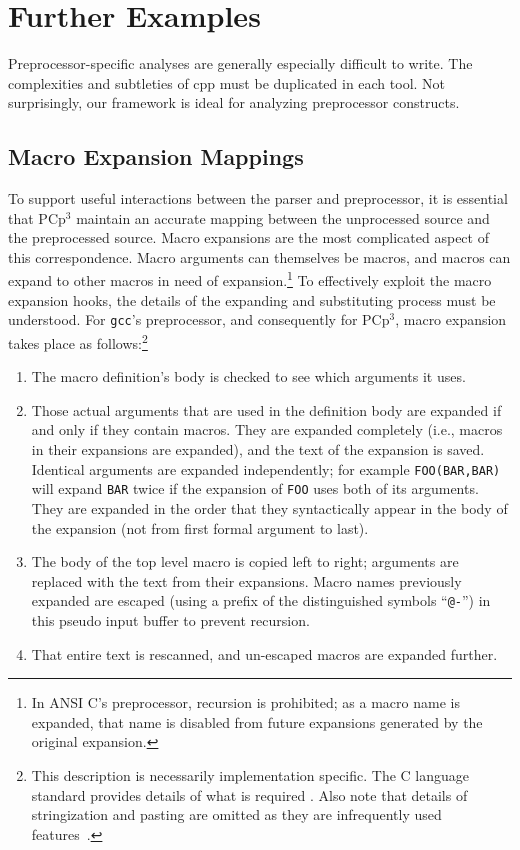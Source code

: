 \documentclass{article}
\newcommand{\pcp}{\mbox{\textsf{PCp}$^3$}}
\newcommand{\Cpp}{\mbox{\textsf{cpp}}}
\newcommand{\C}{\mbox{C}}
\newcommand{\ie}{i.e.,}
\begin{document}

\section*{Further Examples}
\label{sec:further_examples}

Preprocessor-specific analyses are generally especially difficult to
write.  The complexities and subtleties of \Cpp{} must be duplicated in
each tool.  Not surprisingly, our framework is ideal for analyzing
preprocessor constructs.

\subsection*{Macro Expansion Mappings}
\label{ssec:macro_exp_map}
To support useful interactions between the parser and preprocessor, it
is essential that \pcp{} maintain an accurate mapping between the
unprocessed source and the preprocessed source.  Macro expansions are
the most complicated aspect of this correspondence.  Macro arguments can
themselves be macros, and macros can expand to other macros in need of
expansion.\footnote{In ANSI \C{}'s preprocessor, recursion is
  prohibited; as a macro name is expanded, that name is disabled from
  future expansions generated by the original expansion.}  To
effectively exploit the macro expansion hooks, the details of the
expanding and substituting process must be understood.  For
\texttt{gcc}'s preprocessor, and consequently for \pcp{}, macro
expansion takes place as follows:\footnote{This description is necessarily
  implementation specific.  The \C{} language standard provides details
of what is required \cite[Ch.~3]{Harbison91}.  Also note that
  details of stringization and pasting are omitted as they are
  infrequently used features~\cite{EmpCpp}.}

\begin{enumerate}
\item The macro definition's body is checked to see which arguments it uses.
\item Those actual arguments that are used in the definition body are
      expanded if and only if they contain macros.  They are expanded
      completely (\ie{} macros in their expansions are expanded), and
      the text of the expansion is saved.  Identical arguments are
      expanded independently; for example \texttt{FOO(BAR,BAR)} will
      expand \texttt{BAR} twice if the expansion of \texttt{FOO} uses
      both of its arguments.  They are expanded in the order that they
      syntactically appear in the body of the expansion (not from first formal
      argument to last).
\item The body of the top level macro is copied left to right; arguments
      are replaced with the text from their expansions.  Macro names
      previously expanded are escaped (using a prefix of the
      distinguished symbols ``\texttt{@-}'') in this pseudo input buffer
      to prevent recursion.
\item That entire text is rescanned, and un-escaped macros are expanded
      further.
\end{enumerate}
\end{document}
